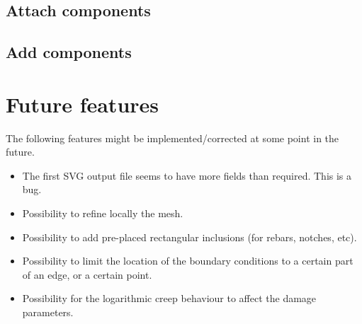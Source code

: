 \documentclass[10pt]{article}
\begin{document}
\subsection{Attach components}

\subsection{Add components}






\section{Future features}

The following features might be implemented/corrected at some point in the future.

\begin{itemize}
	\item The first SVG output file seems to have more fields than required. This is a bug.
	\item Possibility to refine locally the mesh.
	\item Possibility to add pre-placed rectangular inclusions (for rebars, notches, etc).
	\item Possibility to limit the location of the boundary conditions to a certain part of an edge, or a certain point.
	\item Possibility for the logarithmic creep behaviour to affect the damage parameters.
\end{itemize}
\end{document}
